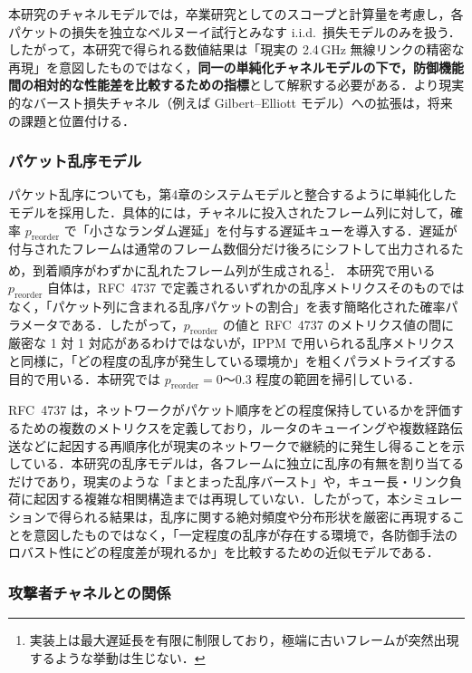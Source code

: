 \documentclass[twocolumn,10pt,a4paper]{jsarticle}
\begin{document}
本研究のチャネルモデルでは，卒業研究としてのスコープと計算量を考慮し，各パケットの損失を独立なベルヌーイ試行とみなす i.i.d.\ 損失モデルのみを扱う．したがって，本研究で得られる数値結果は「現実の 2.4\,GHz 無線リンクの精密な再現」を意図したものではなく，\textbf{同一の単純化チャネルモデルの下で，防御機能間の相対的な性能差を比較するための指標}として解釈する必要がある．より現実的なバースト損失チャネル（例えば Gilbert--Elliott モデル）への拡張は，将来の課題と位置付ける．

\subsubsection{パケット乱序モデル}

パケット乱序についても，第4章のシステムモデルと整合するように単純化したモデルを採用した．具体的には，チャネルに投入されたフレーム列に対して，確率 $p_{\mathrm{reorder}}$ で「小さなランダム遅延」を付与する遅延キューを導入する．遅延が付与されたフレームは通常のフレーム数個分だけ後ろにシフトして出力されるため，到着順序がわずかに乱れたフレーム列が生成される\footnote{実装上は最大遅延長を有限に制限しており，極端に古いフレームが突然出現するような挙動は生じない．}．
本研究で用いる $p_{\mathrm{reorder}}$ 自体は，RFC~4737 で定義されるいずれかの乱序メトリクスそのものではなく，「パケット列に含まれる乱序パケットの割合」を表す簡略化された確率パラメータである．したがって，$p_{\mathrm{reorder}}$ の値と RFC~4737 のメトリクス値の間に厳密な 1 対 1 対応があるわけではないが，IPPM で用いられる乱序メトリクス\cite{rfc4737}と同様に，「どの程度の乱序が発生している環境か」を粗くパラメトライズする目的で用いる．本研究では $p_{\mathrm{reorder}} = 0$〜$0.3$ 程度の範囲を掃引している．

RFC~4737 は，ネットワークがパケット順序をどの程度保持しているかを評価するための複数のメトリクスを定義しており\cite{rfc4737}，ルータのキューイングや複数経路伝送などに起因する再順序化が現実のネットワークで継続的に発生し得ることを示している．本研究の乱序モデルは，各フレームに独立に乱序の有無を割り当てるだけであり，現実のような「まとまった乱序バースト」や，キュー長・リンク負荷に起因する複雑な相関構造までは再現していない．したがって，本シミュレーションで得られる結果は，乱序に関する絶対頻度や分布形状を厳密に再現することを意図したものではなく，「一定程度の乱序が存在する環境で，各防御手法のロバスト性にどの程度差が現れるか」を比較するための近似モデルである．

\subsubsection{攻撃者チャネルとの関係}
\end{document}
